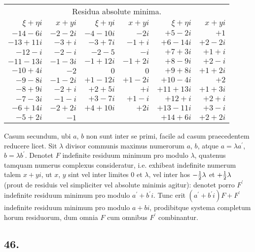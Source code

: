 \documentclass[twoside,12pt]{memoir}
\let\oldfrac\frac
\def\frac#1#2{\mathchoice{\tfrac{#1}{#2}}{\oldfrac{#1}{#2}}{\genfrac{}{}{}{2}{#1}{#2\mathstrut}}{\genfrac{}{}{}{3}{#1}{#2\mathstrut}}}
\begin{document}
\begin{center}
\begin{tabular}{r|r||r|r||r|r}
\multicolumn{6}{c}{Residua absolute minima.}\\
\(\xi+\eta i\) & \(x+y i\) & \(\xi+\eta i\) & \(x+y i\) & \(\xi+\eta i\) & \(x+y i\) \\
\hline
\(-14-6 i\) & \(-2-2 i\) & \(-4-10 i\) & \(-2 i\) & \(+5-2 i\) & \(+1\) \\
\(-13+11 i\) & \(-3+i\) & \(-3+7 i\) & \(-1+i\) & \(+6-14 i\) & \(+2-2 i\) \\
\(-12-i\) & \(-2-i\) & \(-2-5\) & \(-i\) & \(+7+3 i\) & \(+1+i\) \\
\(-11-13 i\) & \(-1-3 i\) & \(-1+12 i\) & \(-1+2 i\) & \(+8-9 i\) & \(+2-i\) \\
\(-10+4 i\) & \(-2\) & \(0\) & \(0\) & \(+9+8 i\) & \(+1+2 i\) \\
\(-9-8 i\) & \(-1-2 i\) & \(+1-12 i\) & \(+1-2 i\) & \(+10-4 i\) & \(+2\) \\
\(-8+9 i\) & \(-2+i\) & \(+2+5 i\) & \(+i\) & \(+11+13 i\) & \(+1+3 i\) \\
\(-7-3 i\) & \(-1-i\) & \(+3-7 i\) & \(+1-i\) & \(+12+i\) & \(+2+i\) \\
\(-6+14 i\) & \(-2+2 i\) & \(+4+10 i\) & \(+2 i\) & \(+13-11 i\) & \(+3-i\) \\
\(-5+2 i\) & \(-1\) &\multicolumn{2}{c||}{}  & \(+14+6 i\) & \(+2+2 i\) \\
\end{tabular}
\end{center}

Casum secundum, ubi \(a\), \(b\) non sunt inter se primi, facile ad casum praecedentem reducere licet. Sit \(\lambda\) divisor communis maximus numerorum \(a\), \(b\), atque \(a=\lambda a^{\prime}\), \(b=\lambda b^{\prime}\). Denotet \({F}\) indefinite residuum minimum pro modulo \(\lambda\), quatenus tamquam numerus complexus consideratur, i.e. exhibeat indefinite numerum talem \(x+y i\), ut \(x\), \(y\) sint vel inter limites \(0\) et \(\lambda\), vel inter hos \(-\frac{1}{2} \lambda\) et \(+\frac{1}{2} \lambda\) (prout de residuis vel simpliciter vel absolute minimis agitur): denotet porro \(F^{\prime}\) indefinite residuum minimum pro modulo \(a^{\prime}+b^{\prime} i\). Tunc erit \((a^{\prime}+b^{\prime} i) F+F^{\prime}\) indefinite residuum minimum pro modulo \(a+b i\), prodibitque systema completum horum residuorum, dum omnia \(F\) cum omnibus \(F^{\prime}\) combinantur.

\subsection*{46.}
 
\end{document}
